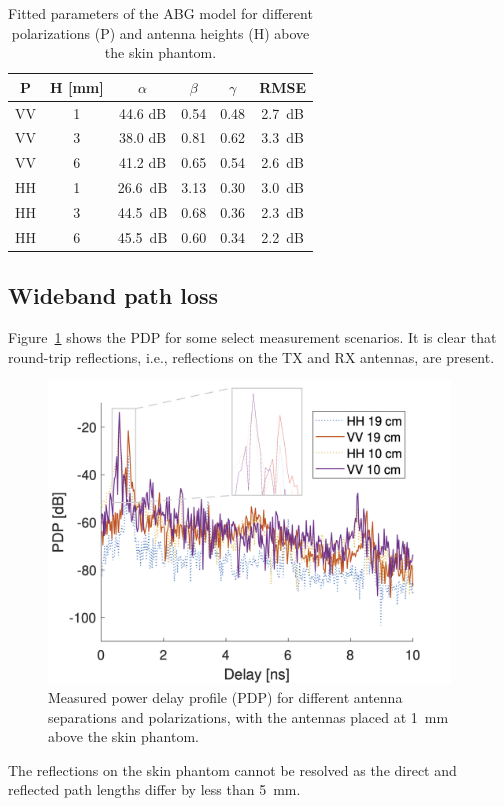\documentclass[manuscript]{rsl}
\begin{document}
\begin{table}[t]
  \caption{Fitted parameters of the ABG model for different polarizations (P) and antenna heights (H) above the skin phantom.}
  \label{table:ABG}
  \begin{center}
    \begin{tabular}{cc|cccc}
      P & H [mm] & $\alpha$ & $\beta$ & $\gamma$ & RMSE \\
      \hline
      VV & 1 & 44.6 dB & 0.54 & 0.48 & 2.7~dB \\
      VV & 3 & 38.0 dB & 0.81 & 0.62 & 3.3~dB \\
      VV & 6 & 41.2 dB & 0.65 & 0.54 & 2.6~dB \\
      HH & 1 & 26.6~dB & 3.13 & 0.30 & 3.0~dB \\
      HH & 3 & 44.5~dB & 0.68 & 0.36 & 2.3~dB \\
      HH & 6 & 45.5~dB & 0.60 & 0.34 & 2.2~dB \\
    \end{tabular}
  \end{center}
\end{table}

\subsection{Wideband path loss}

Figure~\ref{fig:PDP} shows the PDP for some select measurement scenarios. 
It is clear that round-trip reflections, i.e., reflections on the TX and RX antennas, are present.
\begin{figure}[tb]
\begin{center}
	\includegraphics[width=0.95\textwidth]{figures/PDP.png}
\caption{Measured power delay profile (PDP) for different antenna separations and polarizations, with the antennas placed at 1~mm above the skin phantom.}
\label{fig:PDP}
\end{center}
\end{figure}
The reflections on the skin phantom cannot be resolved as the direct and reflected path lengths differ by less than 5~mm.
\end{document}
